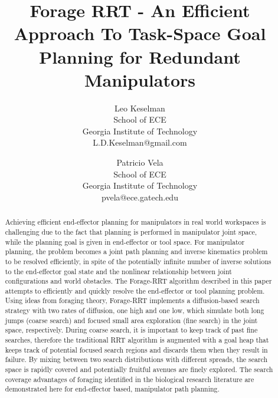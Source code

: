 \documentclass[conference]{IEEEtran}
\begin{document}
\title{Forage RRT - An Efficient Approach To Task-Space Goal Planning for 
  Redundant Manipulators}
\author{%
  Leo Keselman\\ School of ECE\\ Georgia Institute of Technology\\
    L.D.Keselman@gmail.com \and
  Patricio Vela\\ School of ECE\\ Georgia Institute of Technology\\
    pvela@ece.gatech.edu
}
\maketitle

\newcommand{\CITE}{{\bf [CITE]}}

\begin{abstract}
Achieving efficient end-effector planning for manipulators in real world
workspaces is challenging due to the fact that planning is performed in
manipulator joint space, while the planning goal is given in end-effector or
tool space.  
For manipulator planning, the problem becomes a joint path
planning and inverse kinematics problem to be resolved efficiently, in spite
of the potentially infinite number of inverse solutions to the end-effector
goal state and the nonlinear relationship between joint configurations and
world obstacles.  The Forage-RRT algorithm described in this paper attempts
to efficiently and quickly resolve the end-effector or tool planning
problem.  Using ideas from foraging theory, Forage-RRT implements a
diffusion-based search strategy with two rates of diffusion, one high and
one low, which simulate both long jumps (coarse search) and focused small
area exploration (fine search) in the joint space, respectively.  During
coarse search, it is important to keep track of past fine searches,
therefore the traditional RRT algorithm is augmented with a goal heap that
keeps track of potential focused search regions and discards them when
they result in failure.  By mixing between two search distributions with
different spreads, the search space is rapidly covered and potentially
fruitful avenues are finely explored.  The search coverage advantages of
foraging identified in the biological research literature are demonstrated
here for end-effector based, manipulator path planning.  
\end{abstract}

\end{document}
